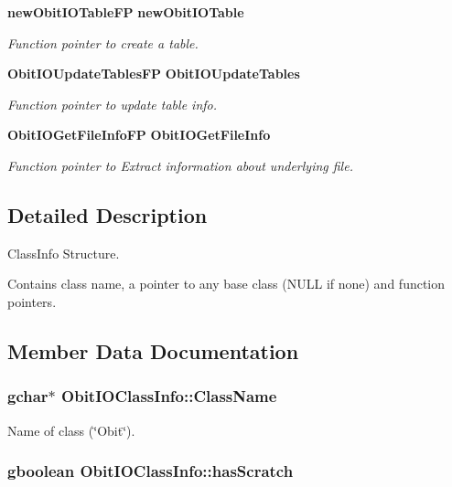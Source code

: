 \begin{CompactItemize}
{\bf new\-Obit\-IOTable\-FP} {\bf new\-Obit\-IOTable}
\begin{CompactList}\small\item\em Function pointer to create a table. \item\end{CompactList}\item 
{\bf Obit\-IOUpdate\-Tables\-FP} {\bf Obit\-IOUpdate\-Tables}
\begin{CompactList}\small\item\em Function pointer to update table info. \item\end{CompactList}\item 
{\bf Obit\-IOGet\-File\-Info\-FP} {\bf Obit\-IOGet\-File\-Info}
\begin{CompactList}\small\item\em Function pointer to Extract information about underlying file. \item\end{CompactList}\end{CompactItemize}


\subsection{Detailed Description}
Class\-Info Structure. 

Contains class name, a pointer to any base class (NULL if none) and function pointers. 



\subsection{Member Data Documentation}
\subsubsection{\setlength{\rightskip}{0pt plus 5cm}gchar$\ast$ {\bf Obit\-IOClass\-Info::Class\-Name}}\label{structObitIOClassInfo_o2}


Name of class (\char`\"{}Obit\char`\"{}). 

\subsubsection{\setlength{\rightskip}{0pt plus 5cm}gboolean {\bf Obit\-IOClass\-Info::has\-Scratch}}\label{structObitIOClassInfo_o1}


